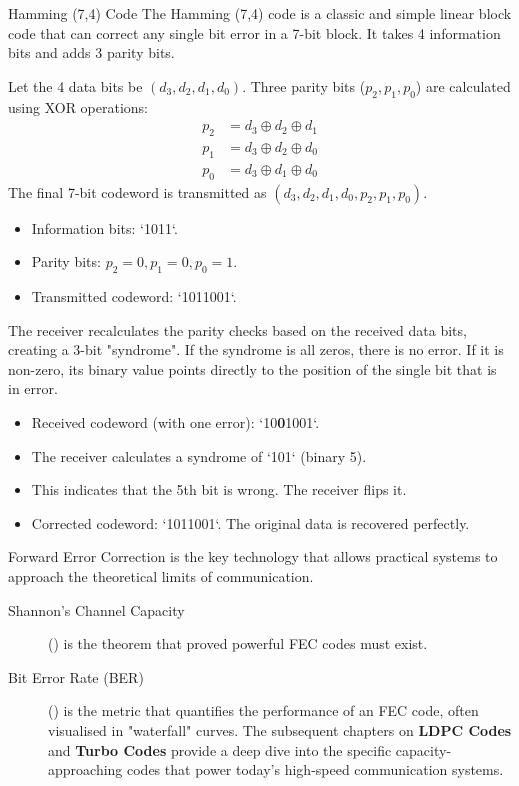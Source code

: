 \begin{workedexample}{Hamming (7,4) Code}
     The Hamming (7,4) code is a classic and simple linear block code that can correct any single bit error in a 7-bit block. It takes 4 information bits and adds 3 parity bits.
    
    Let the 4 data bits be $(d_3, d_2, d_1, d_0)$. Three parity bits ($p_2, p_1, p_0$) are calculated using XOR operations:
    \begin{align*}
        p_2 &= d_3 \oplus d_2 \oplus d_1 \\
        p_1 &= d_3 \oplus d_2 \oplus d_0 \\
        p_0 &= d_3 \oplus d_1 \oplus d_0
    \end{align*}
    The final 7-bit codeword is transmitted as $(d_3, d_2, d_1, d_0, p_2, p_1, p_0)$.

    \begin{itemize}
        \item Information bits: `1011`.
        \item Parity bits: $p_2=0, p_1=0, p_0=1$.
        \item Transmitted codeword: `1011001`.
    \end{itemize}
    
    The receiver recalculates the parity checks based on the received data bits, creating a 3-bit "syndrome". If the syndrome is all zeros, there is no error. If it is non-zero, its binary value points directly to the position of the single bit that is in error.
    \begin{itemize}
        \item Received codeword (with one error): `10\textbf{0}1001`.
        \item The receiver calculates a syndrome of `101` (binary 5).
        \item This indicates that the 5th bit is wrong. The receiver flips it.
        \item Corrected codeword: `1011001`. The original data is recovered perfectly.
    \end{itemize}
\end{workedexample}


\begin{importantbox}[title={Further Reading}]
    Forward Error Correction is the key technology that allows practical systems to approach the theoretical limits of communication.
    \begin{description}
        \item[Shannon's Channel Capacity] () is the theorem that proved powerful FEC codes must exist.
        \item[Bit Error Rate (BER)] () is the metric that quantifies the performance of an FEC code, often visualised in "waterfall" curves.
         The subsequent chapters on \textbf{LDPC Codes} and \textbf{Turbo Codes} provide a deep dive into the specific capacity-approaching codes that power today's high-speed communication systems.
    \end{description}
\end{importantbox}